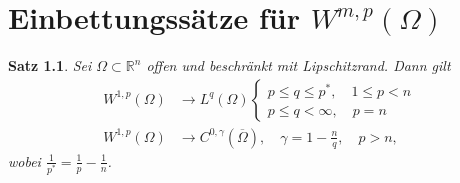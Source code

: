\documentclass[
paper=a4,
bibtotocnumbered,
liststotocnumbered,
tablecaptionabove,
pointlessnumbers,
twoside,
openright,
10pt
]
{report}
\newtheorem{satz}[thm]{Satz}
\theoremstyle{definition}
\numberwithin{equation}{chapter}
\begin{document}
\chapter{Einbettungssätze für $W^{m,p}(\Omega)$} 
\begin{satz}\label{satz 5.1} Sei $\Omega \subset \mathbb R^n$ offen und beschränkt mit Lipschitzrand. Dann gilt
\begin{align*}
W^{1,p}(\Omega) &\to L^q(\Omega) \begin{cases} p \le q \le p^*, \quad 1 \le p < n\\  p \le q <\infty, \quad p =n \end{cases}\\
W^{1,p}(\Omega) &\to C^{0,\gamma}(\overline{\Omega}), \quad \gamma = 1- \frac{n}{q}, \quad p >n,
\end{align*}
wobei $\frac{1}{p^*}= \frac{1}{p}-\frac{1}{n}$.
\end{satz}
\end{document}
